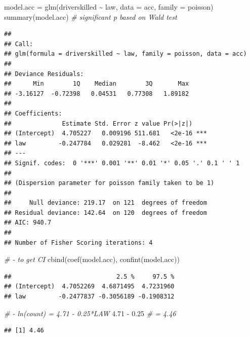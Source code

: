\documentclass[
]{book}
\makeatletter
\newenvironment{Shaded}{\begin{snugshade}}{\end{snugshade}}
\newcommand{\AttributeTok}[1]{\textcolor[rgb]{0.61,0.61,0.61}{#1}}
\newcommand{\CommentTok}[1]{\textcolor[rgb]{0.37,0.37,0.37}{\textit{#1}}}
\newcommand{\FloatTok}[1]{\textcolor[rgb]{0.06,0.06,0.06}{#1}}
\newcommand{\FunctionTok}[1]{\textcolor[rgb]{0,0,0}{#1}}
\newcommand{\NormalTok}[1]{#1}
\newcommand{\OtherTok}[1]{\textcolor[rgb]{0.37,0.37,0.37}{#1}}
\newcommand{\SpecialCharTok}[1]{\textcolor[rgb]{0,0,0}{#1}}
\newenvironment{kframe}{%
\medskip{}
\setlength{\fboxsep}{.8em}
 \def\at@end@of@kframe{}%
 \ifinner\ifhmode%
  \def\at@end@of@kframe{\end{minipage}}%
  \begin{minipage}{\columnwidth}%
 \fi\fi%
 \def\FrameCommand##1{\hskip\@totalleftmargin \hskip-\fboxsep
 \colorbox{shadecolor}{##1}\hskip-\fboxsep
     \hskip-\linewidth \hskip-\@totalleftmargin \hskip\columnwidth}%
 \MakeFramed {\advance\hsize-\width
   \@totalleftmargin\z@ \linewidth\hsize
   \@setminipage}}%
 {\par\unskip\endMakeFramed%
 \at@end@of@kframe}
\renewenvironment{Shaded}{\begin{kframe}}{\end{kframe}}
\makeatother
\begin{document}
\begin{Shaded}
\begin{Highlighting}[]
\NormalTok{model.acc }\OtherTok{=} \FunctionTok{glm}\NormalTok{(driverskilled }\SpecialCharTok{\textasciitilde{}}\NormalTok{ law, }\AttributeTok{data =}\NormalTok{ acc, }\AttributeTok{family =}\NormalTok{ poisson)}
\FunctionTok{summary}\NormalTok{(model.acc)  }\CommentTok{\# significant p based on Wald test}
\end{Highlighting}
\end{Shaded}

\begin{verbatim}
## 
## Call:
## glm(formula = driverskilled ~ law, family = poisson, data = acc)
## 
## Deviance Residuals: 
##      Min        1Q    Median        3Q       Max  
## -3.16127  -0.72398   0.04531   0.77308   1.89182  
## 
## Coefficients:
##              Estimate Std. Error z value Pr(>|z|)    
## (Intercept)  4.705227   0.009196 511.681   <2e-16 ***
## law         -0.247784   0.029281  -8.462   <2e-16 ***
## ---
## Signif. codes:  0 '***' 0.001 '**' 0.01 '*' 0.05 '.' 0.1 ' ' 1
## 
## (Dispersion parameter for poisson family taken to be 1)
## 
##     Null deviance: 219.17  on 121  degrees of freedom
## Residual deviance: 142.64  on 120  degrees of freedom
## AIC: 940.7
## 
## Number of Fisher Scoring iterations: 4
\end{verbatim}

\begin{Shaded}
\begin{Highlighting}[]
\CommentTok{\# {-} to get CI}
\FunctionTok{cbind}\NormalTok{(}\FunctionTok{coef}\NormalTok{(model.acc), }\FunctionTok{confint}\NormalTok{(model.acc))}
\end{Highlighting}
\end{Shaded}

\begin{verbatim}
##                             2.5 %     97.5 %
## (Intercept)  4.7052269  4.6871495  4.7231960
## law         -0.2477837 -0.3056189 -0.1908312
\end{verbatim}

\begin{Shaded}
\begin{Highlighting}[]
\CommentTok{\# {-} ln(count) = 4.71 {-} 0.25*LAW}
\FloatTok{4.71} \SpecialCharTok{{-}} \FloatTok{0.25}  \CommentTok{\# = 4.46}
\end{Highlighting}
\end{Shaded}

\begin{verbatim}
## [1] 4.46
\end{verbatim}
\end{document}
